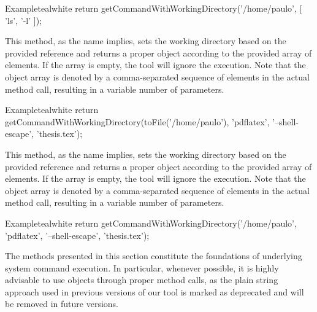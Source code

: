 \begin{description}
\begin{codebox}{Example}{teal}{\icnote}{white}
return getCommandWithWorkingDirectory('/home/paulo',
       [ 'ls', '-l' ]);
\end{codebox}

\item[\mdbox{R}{\parbox{0.62\textwidth}{getCommandWithWorkingDirectory(File directory,\\\hspace*{1em} Object... elements)}}{Command}] This method, as the name implies, sets the working directory based on the provided  reference and returns a proper  object according to the provided array of  elements. If the array is empty, the tool will ignore the execution. Note that the object array is denoted by a comma-separated sequence of elements in the actual method call, resulting in a variable number of parameters.

\begin{codebox}{Example}{teal}{\icnote}{white}
return getCommandWithWorkingDirectory(toFile('/home/paulo'),
       'pdflatex', '--shell-escape', 'thesis.tex');
\end{codebox}

\item[\mdbox{R}{\parbox{0.58\textwidth}{getCommandWithWorkingDirectory(String path,\\\hspace*{1em} Object... elements)}}{Command}] This method, as the name implies, sets the working directory based on the provided  reference and returns a proper  object according to the provided array of  elements. If the array is empty, the tool will ignore the execution. Note that the object array is denoted by a comma-separated sequence of elements in the actual method call, resulting in a variable number of parameters.

\begin{codebox}{Example}{teal}{\icnote}{white}
return getCommandWithWorkingDirectory('/home/paulo',
       'pdflatex', '--shell-escape', 'thesis.tex');
\end{codebox}
\end{description}

The methods presented in this section constitute the foundations of underlying system command execution. In particular, whenever possible, it is highly advisable to use  objects through proper  method calls, as the plain string approach used in previous versions of our tool is marked as deprecated and will be removed in future versions.

